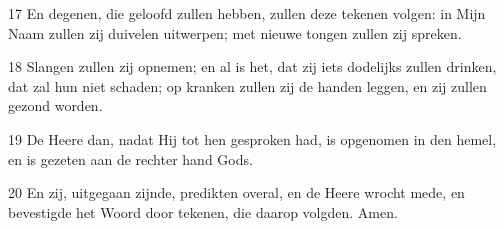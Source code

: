 \par 17 En degenen, die geloofd zullen hebben, zullen deze tekenen volgen: in Mijn Naam zullen zij duivelen uitwerpen; met nieuwe tongen zullen zij spreken.
\par 18 Slangen zullen zij opnemen; en al is het, dat zij iets dodelijks zullen drinken, dat zal hun niet schaden; op kranken zullen zij de handen leggen, en zij zullen gezond worden.
\par 19 De Heere dan, nadat Hij tot hen gesproken had, is opgenomen in den hemel, en is gezeten aan de rechter hand Gods.
\par 20 En zij, uitgegaan zijnde, predikten overal, en de Heere wrocht mede, en bevestigde het Woord door tekenen, die daarop volgden. Amen.




